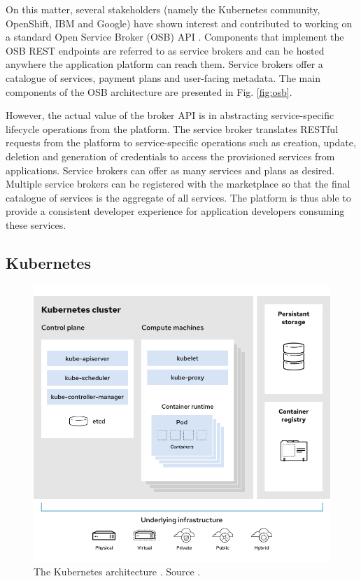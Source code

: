 On this matter, several stakeholders (namely the Kubernetes community, OpenShift, IBM and Google) have shown interest and contributed to working on a standard Open Service Broker (OSB) API \cite{osb}. Components that implement the OSB REST endpoints are referred to as service brokers and can be hosted anywhere the application platform can reach them. Service brokers offer a catalogue of services, payment plans and user-facing metadata. The main components of the OSB architecture are presented in Fig. \ref{fig:osb}.

However, the actual value of the broker API is in abstracting service-specific lifecycle operations from the platform. The service broker translates RESTful requests from the platform to service-specific operations such as creation, update, deletion and generation of credentials to access the provisioned services from applications. Service brokers can offer as many services and plans as desired. Multiple service brokers can be registered with the marketplace so that the final catalogue of services is the aggregate of all services. The platform is thus able to provide a consistent developer experience for application developers consuming these services.

\subsection{Kubernetes}
\label{sec:kubernetes}

\begin{figure}[ht]
\centering
\includegraphics[width=\columnwidth]{figures/kubernetes}
\caption{The Kubernetes architecture \label{fig:kubernetes}. Source \cite{k8s-architecture}.}
\end{figure}

